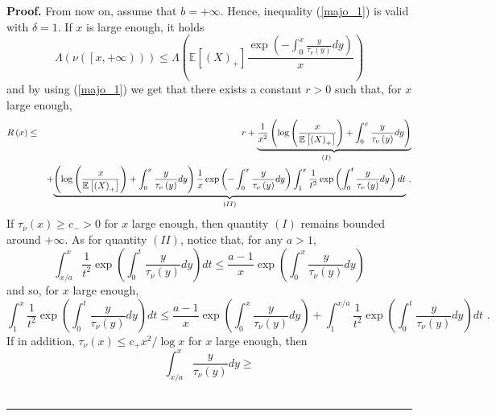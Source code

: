 \documentclass[11pt]{article}
\newenvironment{proof}[1][Proof]{\noindent\textbf{#1.} }{\ \rule{0.5em}{0.5em}}
\begin{document}
\begin{proof}
From now on, assume that $b=+\infty $. Hence, inequality (\ref{majo_1}) is
valid with $\delta =1$. If $x$ is large enough, it holds%
\begin{equation*}
\Lambda \left( \nu \left( \left[ x,+\infty \right) \right) \right) \leq
\Lambda \left( \mathbb{E}\left[ \left( X\right) _{+}\right] \frac{\exp
\left( -\int_{0}^{x}\frac{y}{\mathcal{\tau }_{\nu }\left( y\right) }%
dy\right) }{x}\right)
\end{equation*}%
and by using (\ref{majo_1}) we get that there exists a constant $r>0$ such
that, for $x$ large enough,%
\begin{eqnarray}
R\left( x\right) &\leq &\underset{(I)}{r+\underbrace{\frac{1}{x^{2}}\left(
\log \left( \frac{x}{\mathbb{E}\left[ \left( X\right) _{+}\right] }\right)
+\int_{0}^{x}\frac{y}{\mathcal{\tau }_{\nu }\left( y\right) }dy\right) }}
\label{ineq_upper} \\
&&+\underset{(II)}{\underbrace{\left( \log \left( \frac{x}{\mathbb{E}\left[
\left( X\right) _{+}\right] }\right) +\int_{0}^{x}\frac{y}{\mathcal{\tau }%
_{\nu }\left( y\right) }dy\right) \frac{1}{x}\exp \left( -\int_{0}^{x}\frac{y%
}{\mathcal{\tau }_{\nu }\left( y\right) }dy\right) \int_{1}^{x}\frac{1}{t^{2}%
}\exp \left( \int_{0}^{t}\frac{y}{\mathcal{\tau }_{\nu }\left( y\right) }%
dy\right) dt}}\text{ .}  \notag
\end{eqnarray}%
If $\tau _{\nu }\left( x\right) \geq c_{-}>0$ for $x$ large enough, then
quantity $\left( I\right) $ remains bounded around $+\infty $. As for
quantity $(II)$, notice that, for any $a>1$,%
\begin{equation*}
\int_{x/a}^{x}\frac{1}{t^{2}}\exp \left( \int_{0}^{t}\frac{y}{\mathcal{\tau }%
_{\nu }\left( y\right) }dy\right) dt\leq \frac{a-1}{x}\exp \left(
\int_{0}^{x}\frac{y}{\mathcal{\tau }_{\nu }\left( y\right) }dy\right)
\end{equation*}%
and so, for $x$ large enough,%
\begin{equation*}
\int_{1}^{x}\frac{1}{t^{2}}\exp \left( \int_{0}^{t}\frac{y}{\mathcal{\tau }%
_{\nu }\left( y\right) }dy\right) dt\leq \frac{a-1}{x}\exp \left(
\int_{0}^{x}\frac{y}{\mathcal{\tau }_{\nu }\left( y\right) }dy\right)
+\int_{1}^{x/a}\frac{1}{t^{2}}\exp \left( \int_{0}^{t}\frac{y}{\mathcal{\tau 
}_{\nu }\left( y\right) }dy\right) dt\text{ .}
\end{equation*}%
If in addition, $\tau _{\nu }\left( x\right) \leq c_{+}x^{2}/\log x$ for $x$
large enough, then%
\begin{equation*}
\int_{x/a}^{x}\frac{y}{\tau _{\nu }\left( y\right) }dy\geq

\end{equation*}
\end{proof}
\end{document}
